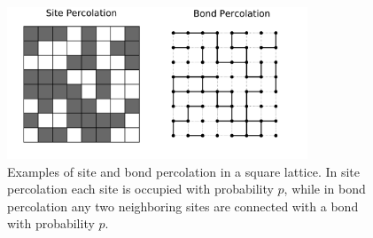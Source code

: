 \begin{figure}
\begin{center}
    \includegraphics[width=0.8\textwidth]{chapters/ch2-crit/figs/sitebond}
\end{center}
\caption{Examples of site and bond percolation in a square lattice.
    In site percolation each site is occupied with probability $p$, while
    in bond percolation any two neighboring sites are connected with a bond
    with probability $p$.}
\label{fig:sitebond}
\end{figure}



